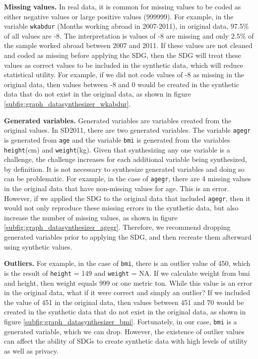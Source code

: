 \documentclass[runningheads]{llncs}
\begin{document}
{\bf Missing values.} In real data, it is common for missing values to be coded as either negative values or large positive values (999999).  For example, in the variable \texttt{wkabdur} (Months working abroad in 2007-2011), in original data, 97.5\% of all values are -8.  The interpretation is values of -8 are missing and only 2.5\% of the sample worked abroad between 2007 and 2011.  If these values are not cleaned and coded as missing before applying the SDG, then the SDG will treat these values as correct values to be included in the synthetic data, which will reduce statistical utility.  For example, if we did not code values of -8 as missing in the original data, then values between -8 and 0 would be created in the synthetic data that do not exist in the original data, as shown in figure \ref{subfig:graph_datasynthesizer_wkabdur}.  

{\bf Generated variables.} Generated variables are variables created from the original values.  In SD2011, there are two generated variables.  The variable \texttt{agegr} is generated from \texttt{age} and the variable \texttt{bmi} is generated from the variables \texttt{height}(cm) and \texttt{weight}(kg).  Given that synthesizing any one variable is a challenge, the challenge increases for each additional variable being synthesized, by definition.  It is not necessary to synthesize generated variables and doing so can be problematic.  For example, in the case of \texttt{agegr}, there are 4 missing values in the original data that have non-missing values for age.  This is an error.  However, if we applied the SDG to the original data that included \texttt{agegr}, then it would not only reproduce these missing errors in the synthetic data, but also increase the number of missing values, as shown in figure \ref{subfig:graph_datasynthesizer_agegr}.  Therefore, we recommend dropping generated variables prior to applying the SDG, and then recreate them afterward using synthetic values.  

{\bf Outliers.} For example, in the case of \texttt{bmi}, there is an outlier value of 450, which is the result of \texttt{height} = 149 and \texttt{weight} = NA.  If we calculate weight from bmi and height, then weight equals 999 or one metric ton.  While this value is an error in the original data, what if it were correct and simply an outlier?  If we included the value of 451 in the original data, then values between 451 and 70 would be created in the synthetic data that do not exist in the original data, as shown in figure \ref{subfig:graph_datasynthesizer_bmi}.  Fortunately, in our case, \texttt{bmi} is a generated variable, which we can drop.  However, the existence of outlier values can affect the ability of SDGs to create synthetic data with high levels of utility as well as privacy.  
\end{document}
